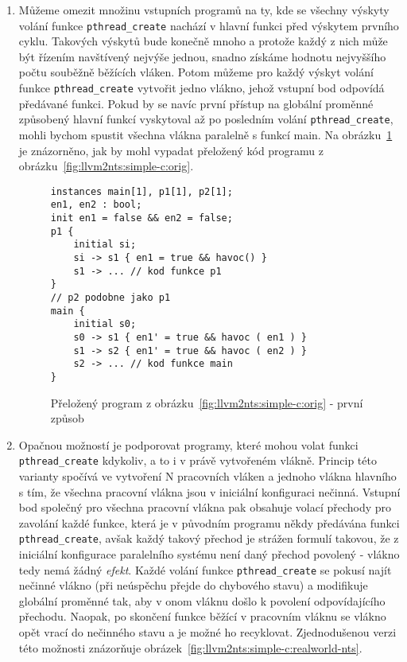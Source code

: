 \documentclass[10pt,a4paper,notitlepage]{report}
\begin{document}
\begin{enumerate}
\item Můžeme omezit množinu vstupních programů na ty, kde se všechny výskyty volání funkce \texttt{pthread\_create} nachází v hlavní funkci před výskytem prvního cyklu. Takových výskytů bude konečně mnoho a protože každý z nich může být řízením navštívený nejvýše jednou, snadno získáme hodnotu nejvyššího počtu souběžně běžících vláken. Potom můžeme pro každý výskyt volání funkce \texttt{pthread\_create} vytvořit jedno vlákno, jehož vstupní bod odpovídá předávané funkci. Pokud by se navíc první přístup na globální proměnné způsobený hlavní funkcí vyskytoval až po posledním volání \texttt{pthread\_create}, mohli bychom spustit všechna vlákna paralelně s funkcí main. Na obrázku~\ref{fig:llvm2nts:simple-c:simple-nts} je znázorněno, jak by mohl vypadat přeložený kód programu z obrázku~\ref{fig:llvm2nts:simple-c:orig}.


\begin{figure}[h]
\begin{lstlisting}
instances main[1], p1[1], p2[1];
en1, en2 : bool;
init en1 = false && en2 = false;
p1 {
	initial si;
	si -> s1 { en1 = true && havoc() }
	s1 -> ... // kod funkce p1
}
// p2 podobne jako p1
main {
	initial s0;
	s0 -> s1 { en1' = true && havoc ( en1 ) }
	s1 -> s2 { en1' = true && havoc ( en2 ) }
	s2 -> ... // kod funkce main
}
\end{lstlisting}
\caption{Přeložený program z obrázku~\ref{fig:llvm2nts:simple-c:orig} - první způsob}
\label{fig:llvm2nts:simple-c:simple-nts}
\end{figure}

\item Opačnou možností je podporovat programy, které mohou volat funkci \texttt{pthread\_create} kdykoliv, a to i v právě vytvořeném vlákně. Princip této varianty spočívá ve vytvoření N pracovních vláken a jednoho vlákna hlavního s tím, že všechna pracovní vlákna jsou v iniciální konfiguraci nečinná. Vstupní bod společný pro všechna pracovní vlákna pak obsahuje volací přechody pro zavolání každé funkce, která je v původním programu někdy předávána funkci \texttt{pthread\_create}, avšak každý takový přechod je strážen formulí takovou, že z iniciální konfigurace paralelního systému není daný přechod povolený - vlákno tedy nemá žádný \textit{efekt}. Každé volání funkce \texttt{pthread\_create} se pokusí najít nečinné vlákno (při neúspěchu přejde do chybového stavu) a modifikuje globální proměnné tak, aby v onom vláknu došlo k povolení odpovídajícího přechodu. Naopak, po skončení funkce běžící v pracovním vláknu se vlákno opět vrací do nečinného stavu a je možné ho recyklovat. Zjednodušenou verzi této možnosti znázorňuje obrázek~\ref{fig:llvm2nts:simple-c:realworld-nts}.
\end{enumerate}
\end{document}
